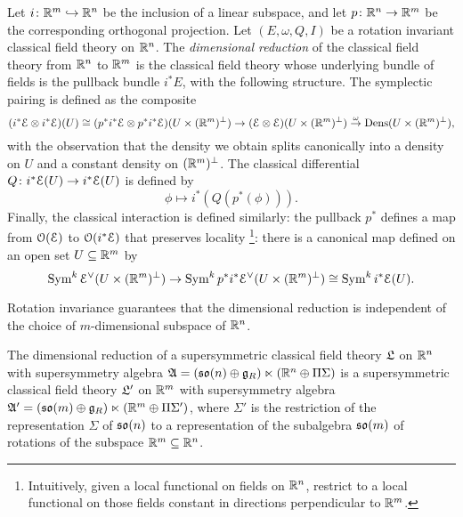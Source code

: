 \documentclass[10pt, oneside]{article}
\begin{document}
\begin{definition}
Let $i\colon \mathbb R^m \hookrightarrow \mathbb R^n$ be the inclusion of a linear subspace, and let $p \colon \mathbb R^n \to \mathbb R^m$ be the corresponding orthogonal projection. Let $(E, \omega, Q, I)$ be a rotation invariant classical field theory on $\mathbb R^n$.  The \emph{dimensional reduction} of the classical field theory from $\mathbb R^n$ to $\mathbb R^m$ is the classical field theory whose underlying bundle of fields is the pullback bundle $i^*E$, with the following structure.  The symplectic pairing is defined as the composite
\[(i^*\mathcal{E} \otimes i^*\mathcal{E})(U) \cong (p^*i^*\mathcal{E} \otimes p^*i^*\mathcal{E})(U \times (\mathbb R^m)^\perp) \to (\mathcal{E} \otimes \mathcal{E})(U \times (\mathbb R^m)^\perp) \overset \omega \to \operatorname{Dens}(U \times (\mathbb R^m)^\perp),\]
with the observation that the density we obtain splits canonically into a density on $U$ and a constant density on $(\mathbb R^m)^\perp$.  The classical differential $Q \colon i^*\mathcal{E}(U) \to i^*\mathcal{E}(U)$ is defined by
\[\phi \mapsto i^*(Q(p^*(\phi))).\]
Finally, the classical interaction is defined similarly: the pullback $p^*$ defines a map from $\mathcal{O}(\mathcal{E})$ to $\mathcal{O}(i^*\mathcal{E})$ that preserves locality \footnote{Intuitively, given a local functional on fields on $\mathbb R^n$, restrict to a local functional on those fields constant in directions perpendicular to $\mathbb R^m$.}: there is a canonical map defined on an open set $U \subseteq \mathbb R^m$ by
\[\operatorname{Sym}^k \mathcal{E}^\vee(U\times (\mathbb R^m)^\perp) \to \operatorname{Sym}^k p^*i^*\mathcal{E}^\vee(U\times (\mathbb R^m)^\perp) \cong \operatorname{Sym}^k i^*\mathcal{E}(U).\]
\end{definition}

Rotation invariance guarantees that the dimensional reduction is independent of the choice of $m$-dimensional subspace of $\mathbb R^n$.

\begin{prop} \label{dim_red_SUSY_prop}
The dimensional reduction of a supersymmetric classical field theory $\mathfrak{L}$ on $\mathbb R^n$ with supersymmetry algebra $\mathfrak{A} = (\mathfrak{so}(n) \oplus \mathfrak{g}_R) \ltimes (\mathbb R^n \oplus \Pi \Sigma)$ is a supersymmetric classical field theory $\mathfrak{L}'$ on $\mathbb R^m$ with supersymmetry algebra $\mathfrak{A}' = (\mathfrak{so}(m) \oplus \mathfrak{g}_R) \ltimes (\mathbb R^m \oplus \Pi \Sigma')$, where $\Sigma'$ is the restriction of the representation $\Sigma$ of $\mathfrak{so}(n)$ to a representation of the subalgebra $\mathfrak{so}(m)$ of rotations of the subspace $\mathbb R^m \subseteq \mathbb R^n$.
\end{prop}
\end{document}

